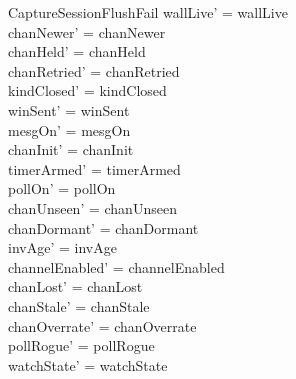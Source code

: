 \documentclass[a4paper,10pt,fleqn]{article}
\begin{document}
\begin{schema}{CaptureSessionFlushFail}
  wallLive' = wallLive \\
  chanNewer' = chanNewer \\
  chanHeld' = chanHeld \\
  chanRetried' = chanRetried \\
  kindClosed' = kindClosed \\
  winSent' = winSent \\
  mesgOn' = mesgOn \\
  chanInit' = chanInit \\
  timerArmed' = timerArmed \\
  pollOn' = pollOn \\
  chanUnseen' = chanUnseen \\
  chanDormant' = chanDormant \\
  invAge' = invAge \\
  channelEnabled' = channelEnabled \\
  chanLost' = chanLost \\
  chanStale' = chanStale \\
  chanOverrate' = chanOverrate \\
  pollRogue' = pollRogue \\
  watchState' = watchState
\end{schema}
\end{document}
